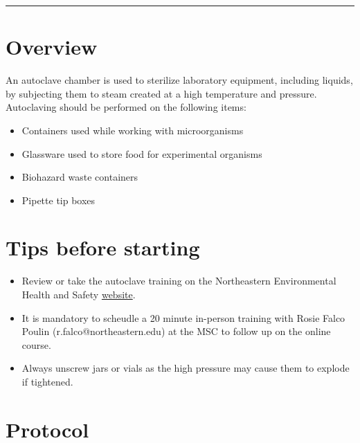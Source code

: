 \documentclass[
  letterpaper,
  DIV=11,
  numbers=noendperiod]{scrreprt}
\begin{document}
\begin{center}\rule{0.5\linewidth}{0.5pt}\end{center}

\hypertarget{overview}{%
\section*{\texorpdfstring{\textbf{Overview}}{Overview}}\label{overview}}


An autoclave chamber is used to sterilize laboratory equipment,
including liquids, by subjecting them to steam created at a high
temperature and pressure. Autoclaving should be performed on the
following items:

\begin{itemize}
\item
  Containers used while working with microorganisms
\item
  Glassware used to store food for experimental organisms
\item
  Biohazard waste containers
\item
  Pipette tip boxes
\end{itemize}

\hypertarget{tips-before-starting}{%
\section*{\texorpdfstring{\textbf{Tips before
starting}}{Tips before starting}}\label{tips-before-starting}}


\begin{itemize}
\item
  Review or take the autoclave training on the Northeastern
  Environmental Health and Safety
  \href{https://northeastern.bioraft.com/node/1895187}{website}.
\item
  It is mandatory to scheudle a 20 minute in-person training with Rosie
  Falco Poulin (r.falco@northeastern.edu) at the MSC to follow up on the
  online course.
\item
  Always unscrew jars or vials as the high pressure may cause them to
  explode if tightened.
\end{itemize}

\hypertarget{protocol}{%
\section*{\texorpdfstring{\textbf{Protocol}}{Protocol}}\label{protocol}}
\end{document}
